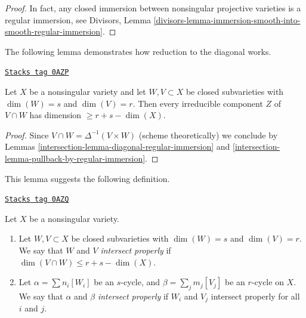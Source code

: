 \begin{proof}
In fact, any closed immersion between nonsingular projective
varieties is a regular immersion, see Divisors,
Lemma \ref{divisors-lemma-immersion-smooth-into-smooth-regular-immersion}.
\end{proof}

The following lemma demonstrates how reduction to the diagonal works.

\begin{lemma}
\label{intersection-lemma-intersect-in-smooth}
\href{https://stacks.math.columbia.edu/tag/0AZP}{\texttt{Stacks tag 0AZP}}

Let $X$ be a nonsingular variety and let $W,V \subset X$
be closed subvarieties with $\dim(W) = s$ and $\dim(V) = r$. Then every
irreducible component $Z$ of $V \cap W$ has dimension $\geq r + s - \dim(X)$.
\end{lemma}

\begin{proof}

Since $V \cap W = \Delta^{-1}(V \times W)$ (scheme theoretically)
we conclude by Lemmas \ref{intersection-lemma-diagonal-regular-immersion} and
\ref{intersection-lemma-pullback-by-regular-immersion}.
\end{proof}

This lemma suggests the following definition.

\begin{definition}
\label{intersection-definition-proper-intersection}
\href{https://stacks.math.columbia.edu/tag/0AZQ}{\texttt{Stacks tag 0AZQ}}

Let $X$ be a nonsingular variety.
\begin{enumerate}
\item Let $W,V \subset X$ be closed subvarieties with
$\dim(W) = s$ and $\dim(V) = r$. We say that $W$ and $V$
{\it intersect properly} if $\dim(V \cap W) \leq r + s - \dim(X)$.
\item Let $\alpha = \sum n_i [W_i]$ be an $s$-cycle,
and $\beta = \sum_j m_j [V_j]$ be an $r$-cycle on $X$. We say
that $\alpha$ and $\beta$ {\it intersect properly} if
$W_i$ and $V_j$ intersect properly for all $i$ and $j$.
\end{enumerate}
\end{definition}

